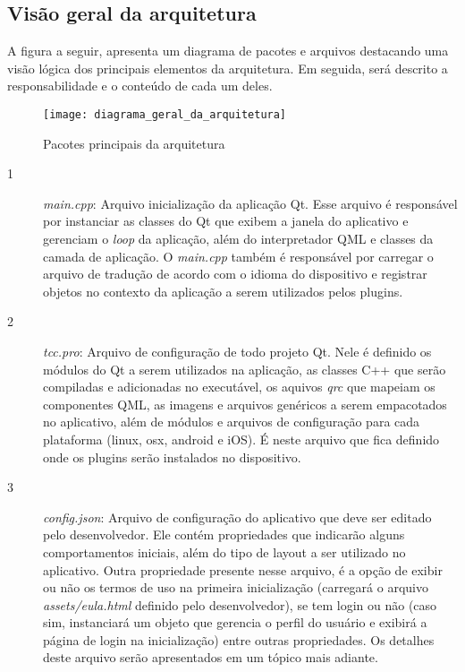 \subsection{Visão geral da arquitetura}
A figura a seguir, apresenta um diagrama de pacotes e arquivos destacando uma visão lógica dos principais elementos da arquitetura. Em seguida, será descrito a responsabilidade e o conteúdo de cada um deles.

\begin{figure}[H]
	\texttt{[image: diagrama\_geral\_da\_arquitetura]}
	\centering
	\caption{Pacotes principais da arquitetura}
\end{figure}

\begin{description}
	\item[1] \textit{main.cpp}: Arquivo inicialização da aplicação Qt. Esse arquivo é responsável por instanciar as classes do Qt que exibem a janela do aplicativo e gerenciam o \textit{loop} da aplicação, além do interpretador QML e classes da camada de aplicação. O \textit{main.cpp} também é responsável por carregar o arquivo de tradução de acordo com o idioma do dispositivo e registrar objetos no contexto da aplicação a serem utilizados pelos plugins.

	\item[2] \textit{tcc.pro}: Arquivo de configuração de todo projeto Qt. Nele é definido os módulos do Qt a serem utilizados na aplicação, as classes C++ que serão compiladas e adicionadas no executável, os aquivos \textit{qrc} que mapeiam os componentes QML, as imagens e arquivos genéricos a serem empacotados no aplicativo, além de módulos e arquivos de configuração para cada plataforma (linux, osx, android e iOS). É neste arquivo que fica definido onde os plugins serão instalados no dispositivo.

	\item[3] \textit{config.json}: Arquivo de configuração do aplicativo que deve ser editado pelo desenvolvedor. Ele contém propriedades que indicarão alguns comportamentos iniciais, além do tipo de layout a ser utilizado no aplicativo. Outra propriedade presente nesse arquivo, é a opção de exibir ou não os termos de uso na primeira inicialização (carregará o arquivo \textit{assets/eula.html} definido pelo desenvolvedor), se tem login ou não (caso sim, instanciará um objeto que gerencia o perfil do usuário e exibirá a página de login na inicialização) entre outras propriedades. Os detalhes deste arquivo serão apresentados em um tópico mais adiante.


\end{description}
